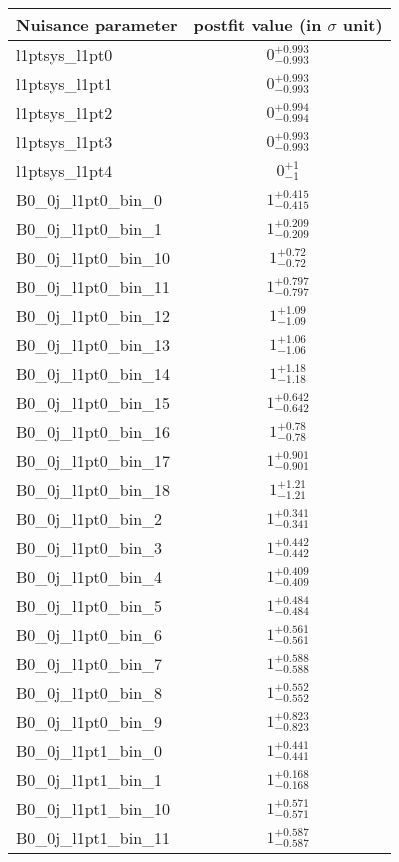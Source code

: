 
\begin{tabular}{|l|c|}
\hline
Nuisance parameter & postfit value (in $\sigma$ unit) \\\hline
l1ptsys\_l1pt0 & $0^{+0.993}_{-0.993}$ \\
l1ptsys\_l1pt1 & $0^{+0.993}_{-0.993}$ \\
l1ptsys\_l1pt2 & $0^{+0.994}_{-0.994}$ \\
l1ptsys\_l1pt3 & $0^{+0.993}_{-0.993}$ \\
l1ptsys\_l1pt4 & $0^{+1}_{-1}$ \\
B0\_0j\_l1pt0\_bin\_0 & $1^{+0.415}_{-0.415}$ \\
B0\_0j\_l1pt0\_bin\_1 & $1^{+0.209}_{-0.209}$ \\
B0\_0j\_l1pt0\_bin\_10 & $1^{+0.72}_{-0.72}$ \\
B0\_0j\_l1pt0\_bin\_11 & $1^{+0.797}_{-0.797}$ \\
B0\_0j\_l1pt0\_bin\_12 & $1^{+1.09}_{-1.09}$ \\
B0\_0j\_l1pt0\_bin\_13 & $1^{+1.06}_{-1.06}$ \\
B0\_0j\_l1pt0\_bin\_14 & $1^{+1.18}_{-1.18}$ \\
B0\_0j\_l1pt0\_bin\_15 & $1^{+0.642}_{-0.642}$ \\
B0\_0j\_l1pt0\_bin\_16 & $1^{+0.78}_{-0.78}$ \\
B0\_0j\_l1pt0\_bin\_17 & $1^{+0.901}_{-0.901}$ \\
B0\_0j\_l1pt0\_bin\_18 & $1^{+1.21}_{-1.21}$ \\
B0\_0j\_l1pt0\_bin\_2 & $1^{+0.341}_{-0.341}$ \\
B0\_0j\_l1pt0\_bin\_3 & $1^{+0.442}_{-0.442}$ \\
B0\_0j\_l1pt0\_bin\_4 & $1^{+0.409}_{-0.409}$ \\
B0\_0j\_l1pt0\_bin\_5 & $1^{+0.484}_{-0.484}$ \\
B0\_0j\_l1pt0\_bin\_6 & $1^{+0.561}_{-0.561}$ \\
B0\_0j\_l1pt0\_bin\_7 & $1^{+0.588}_{-0.588}$ \\
B0\_0j\_l1pt0\_bin\_8 & $1^{+0.552}_{-0.552}$ \\
B0\_0j\_l1pt0\_bin\_9 & $1^{+0.823}_{-0.823}$ \\
B0\_0j\_l1pt1\_bin\_0 & $1^{+0.441}_{-0.441}$ \\
B0\_0j\_l1pt1\_bin\_1 & $1^{+0.168}_{-0.168}$ \\
B0\_0j\_l1pt1\_bin\_10 & $1^{+0.571}_{-0.571}$ \\
B0\_0j\_l1pt1\_bin\_11 & $1^{+0.587}_{-0.587}$ \\

\end{tabular}
